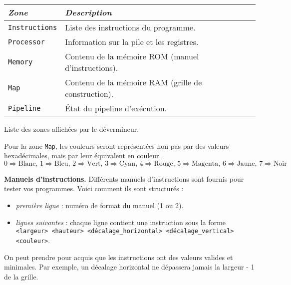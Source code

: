 \begin{center}
\begin{tabular}{ll}
  \toprule
  \emph{Zone} & \emph{Description} \\
  \midrule
  \texttt{Instructions} & Liste des instructions du programme. \\
  \texttt{Processor} & Information sur la pile et les registres. \\
  \texttt{Memory} & Contenu de la mémoire ROM (manuel d'instructions). \\
  \texttt{Map} & Contenu de la mémoire RAM (grille de construction). \\
  \texttt{Pipeline} & État du pipeline d'exécution. \\
  \bottomrule
\end{tabular}
\medskip

Liste des zones affichées par le dévermineur.
\end{center}
\medskip

\noindent
Pour la zone \texttt{Map}, les couleurs seront représentées non pas 
par des valeurs hexadécimales, mais par leur équivalent en couleur.
\[
  0 \Rightarrow \text{Blanc, } 1 \Rightarrow \text{Bleu, }
  2 \Rightarrow \text{Vert, } 3 \Rightarrow \text{Cyan, }
  4 \Rightarrow \text{Rouge, } 5 \Rightarrow \text{Magenta, }
  6 \Rightarrow \text{Jaune, } 7 \Rightarrow \text{Noir}
\]
\medskip

\noindent
\textbf{Manuels d'instructions. } \quad
Différents manuels d'instructions sont fournis pour tester vos 
programmes. Voici comment ils sont structurés :
\begin{itemize}
  \item \emph{première ligne} : numéro de format du manuel (1 ou 2).
  \item \emph{lignes suivantes} : chaque ligne contient une 
    instruction sous la forme \\ 
    \texttt{<largeur> <hauteur> <décalage\_horizontal> 
    <décalage\_vertical> <couleur>}.
\end{itemize}
On peut prendre pour acquis que les instructions ont des valeurs 
valides et minimales. Par exemple, un décalage horizontal ne dépassera
jamais la largeur - 1 de la grille. 
